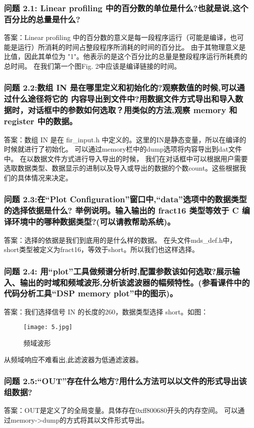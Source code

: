\documentclass{article}
\begin{document}
\begin{CJK}{UTF8}{gbsn}
\subsubsection*{问题 2.1: Linear profiling 中的百分数的单位是什么?也就是说,这个百分比的总量是什么?}
答案：Linear profiling 中的百分数的意义是每一段程序运行（可能是编译，也可能是运行）所消耗的时间占整段程序所消耗的时间的百分比。
由于其物理意义是比值，因此其单位为 "1"。他表示的是这个百分比的总量是整段程序运行所耗费的总时间。
在我们第一个图Fig. 2中应该是编译链接的时间。
\subsubsection*{问题 2.2:数组 IN 是在哪里定义和初始化的?观察数值的时候,可以通过什么途径将它的
内容导出到文件中?用数据文件方式导出和导入数据时，对话框中的参数如何选取？用类似的方法,观察 memory 和 register 中的数据。}
答案：数组 IN 是在 fir\_input.h 中定义的。这里的IN是静态变量，所以在编译的时候就进行了初始化。
可以通过memory栏中的dump选项将内容导出到dat文件中。
在以数据文件方式进行导入导出的时候，
我们在对话框中可以根据用户需要选取数据类型、数据显示的进制以及导入或导出的数据的个数count。这些根据我们的具体情况来决定。
\subsubsection*{问题 2.3:在“Plot Configuration”窗口中,“data”选项中的数据类型的选择依据是什么?
举例说明。输入输出的 fract16 类型等效于 C 编译环境中的哪种数据类型?(可以请教帮助系统)。}
答案：选择的依据是我们到底用的是什么样的数据。
在头文件mds\_def.h中，
short类型被定义为fract16，等效于short。所以我们也这样选择。
\subsubsection*{问题 2.4: 用“plot”工具做频谱分析时,配置参数该如何选取?展示输入、输出的时域和频域波形,分析该滤波器的幅频特性。(参看课件中的代码分析工具“DSP memory plot”中的图示)。}
答案：我们选择信号 IN 的长度的260，数据类型选择 short。如图：
\begin{figure}[h!]
\centering
\texttt{[image: 5.jpg]}
\caption{频域波形}
\end{figure}
从频域响应不难看出,此滤波器为低通滤波器。
\subsubsection*{问题 2.5:“OUT”存在什么地方?用什么方法可以以文件的形式导出该组数据?}
答案：OUT是定义了的全局变量。具体存在0xff800680开头的内存空间。
可以通过memory->dump的方式将其以文件形式导出。

\end{CJK}
\end{document}
